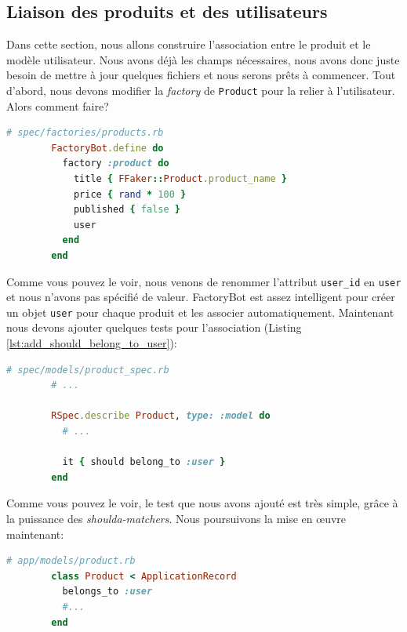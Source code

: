 \documentclass[]{report}
\begin{document}
    \subsection{Liaison des produits et des utilisateurs}\label{subsec:user_has_products}

      Dans cette section, nous allons construire l'association entre le produit et le modèle utilisateur. Nous avons déjà les champs nécessaires, nous avons donc juste besoin de mettre à jour quelques fichiers et nous serons prêts à commencer. Tout d'abord, nous devons modifier la \textit{factory} de \verb|Product| pour la relier à l'utilisateur. Alors comment faire?

      \begin{scriptsize}
        \begin{lstlisting}[language=ruby]
        # spec/factories/products.rb
        FactoryBot.define do
          factory :product do
            title { FFaker::Product.product_name }
            price { rand * 100 }
            published { false }
            user
          end
        end
        \end{lstlisting}
      \end{scriptsize}

      Comme vous pouvez le voir, nous venons de renommer l'attribut \verb|user_id| en \verb|user| et nous n'avons pas spécifié de valeur. FactoryBot est assez intelligent pour créer un objet \verb|user| pour chaque produit et les associer automatiquement. Maintenant nous devons ajouter quelques tests pour l'association (Listing \ref{lst:add_should_belong_to_user}):

      \begin{scriptsize}
        \begin{lstlisting}[language=ruby, caption={Ajout du test de l'association utilisateur au model du produit}, label={lst:add_should_belong_to_user}]
        # spec/models/product_spec.rb
        # ...

        RSpec.describe Product, type: :model do
          # ...

          it { should belong_to :user }
        end
        \end{lstlisting}
      \end{scriptsize}

      Comme vous pouvez le voir, le test que nous avons ajouté est très simple, grâce à la puissance des \textit{shoulda-matchers}. Nous poursuivons la mise en œuvre maintenant:

      \begin{scriptsize}
        \begin{lstlisting}[language=ruby]
        # app/models/product.rb
        class Product < ApplicationRecord
          belongs_to :user
          #...
        end
        \end{lstlisting}
      \end{scriptsize}
\end{document}
